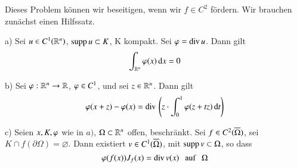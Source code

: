 Dieses Problem können wir beseitigen, wenn wir $f\in C^2$ fördern. Wir brauchen zunächst einen Hilfssatz.

\begin{prop}\label{2.7}
    \begin{description}
        \item{a)}
        Sei $u\in C^1(\mathbb{R}^n)$, $\mathrm{supp}\, u \subset K$, K kompakt. Sei $\varphi=\mathrm{div}\, u$. Dann gilt
        \[
            \int_{\mathbb{R}^n} \varphi (x) \, \mathrm{d} x=0
        \]
        \item{b)}
        Sei $\varphi : \mathbb{R}^n\rightarrow \mathbb{R}$, $\varphi \in C^1$, und sei $z\in \mathbb{R}^n$. Dann gilt
        \[
            \varphi (x+z)-\varphi(x)=\mathrm{div}\, \left( z\cdot \int_0^1 \varphi (z+tz) \, \mathrm{d} t\right)
        \]
        \item{c)}
        Seien $x,K,\varphi$ wie in $a)$, $\Omega \subset \mathbb{R}^n$ offen, beschränkt. Sei $f\in C^2(\overline \Omega)$,
        sei $K\cap f(\partial \Omega)=\varnothing$. Dann existiert $v\in C^1(\overline \Omega)$, mit $\mathrm{supp}\, v
        \subset \Omega$, so dass
        \[
            \varphi (f(x))J_f(x)=\mathrm{div}\, v(x) \hspace{.25cm} \text{auf} \hspace{.25cm} \Omega
        \]
    \end{description}
\end{prop}

